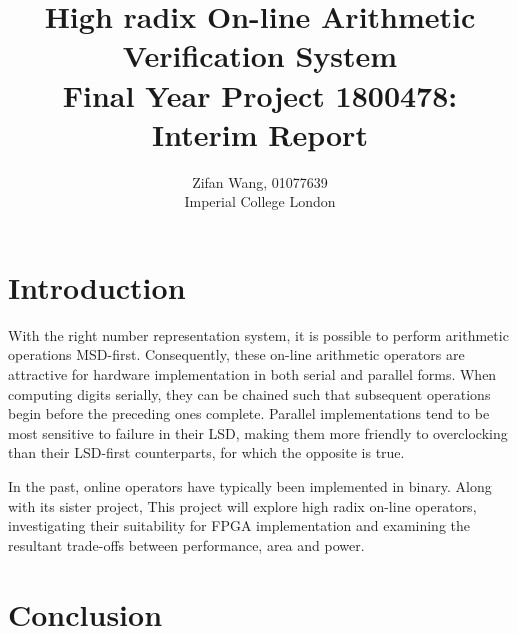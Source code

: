 \documentclass[journal]{IEEEtran}
\begin{document}
\title{%
  High radix On-line Arithmetic Verification System\\
  \large Final Year Project 1800478: Interim Report}
\author{Zifan Wang, 01077639\\Imperial College London}

\onecolumn
\maketitle
\tableofcontents

\twocolumn
\newpage

\section{Introduction}
With the right number representation system, it is possible to perform
arithmetic operations MSD-first.
Consequently, these on-line arithmetic operators are attractive
for hardware implementation in both serial and parallel forms.
When computing digits serially, they can be chained such that subsequent
operations begin before the preceding ones complete.
Parallel implementations tend to be most sensitive to failure in their LSD,
making them more friendly to overclocking than their LSD-first counterparts,
for which the opposite is true.

In the past, online operators have typically been implemented in binary.
Along with its sister project,
This project will explore high radix on-line operators,
investigating their suitability for FPGA implementation and examining the
resultant trade-offs between performance, area and power.








\section{Conclusion}

\newpage
\appendices




\end{document}

